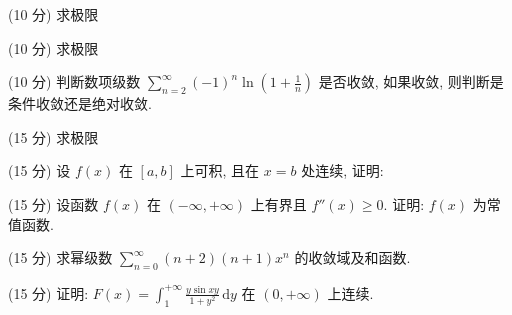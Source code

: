 \par{}
(10 分) 求极限\par
\nopagebreak[4]
\par{}
(10 分) 求极限\par
\nopagebreak[4]
(10 分) 判断数项级数 $\sum_{n=2}^{\infty} (-1)^{n} \ln \left(1 + \frac{1}{n}\right)$ 是否收敛, 如果收敛, 则判断是条件收敛还是绝对收敛.\par
\par{}
(15 分) 求极限\par
\nopagebreak[4]
\par{}
(15 分) 设 $f(x)$ 在 $[a, b]$ 上可积, 且在 $x = b$ 处连续, 证明:\par
\nopagebreak[4]
(15 分) 设函数 $f(x)$ 在 $(- \infty, +\infty)$ 上有界且 $f''(x) \geq 0$. 证明: $f(x)$ 为常值函数.\par
(15 分) 求幂级数 $\sum_{n=0}^{\infty}(n+2)(n+1)x^{n}$ 的收敛域及和函数.\par
(15 分) 证明: $F(x) = \int_{1}^{+\infty} \frac{y \sin xy}{1 + y^2} \, \mathrm{d}y$ 在 $(0, +\infty)$ 上连续.\par
